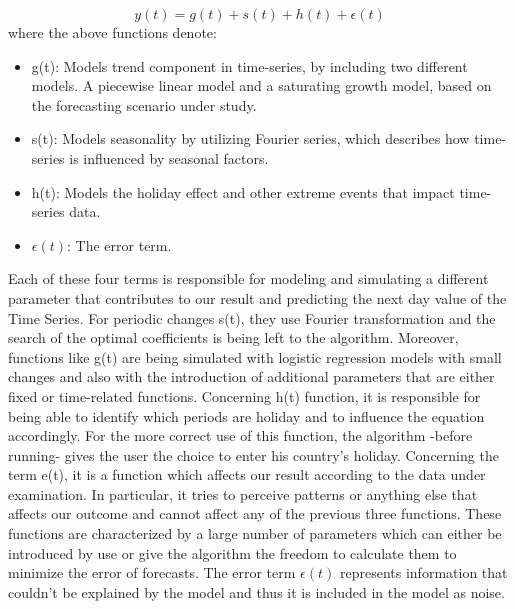 $$y(t)=g(t)+s(t)+h(t)+\epsilon(t)$$
\noindent where the above functions denote:
\begin{itemize}
    \item g(t): Models trend component in time-series, by including two different models. A piecewise linear model and a saturating growth model, based on the forecasting scenario under study.
    \item s(t): Models seasonality by utilizing Fourier series, which describes how time-series is influenced by seasonal factors.
    \item h(t): Models the holiday effect and other extreme events that impact time-series data.
        \item $\epsilon(t)$: The error term.
\end{itemize}
\par Each of these four terms is responsible for modeling and simulating a different parameter that contributes to our result and predicting the next day value of the Time Series. For periodic changes s(t), they use Fourier transformation and the search of the optimal coefficients is being left to the algorithm. Moreover, functions like g(t) are being simulated with logistic regression models with small changes and also with the introduction of additional parameters that are either fixed or time-related functions. Concerning h(t) function, it is responsible for being able to identify which periods are holiday and to influence the equation accordingly. For the more correct use of this function, the algorithm -before running- gives the user the choice to enter his country's holiday. 
Concerning the term e(t), it is a function which affects our result according to the data under examination. In particular, it tries to perceive patterns or anything else that affects our outcome and cannot affect any of the previous three functions. These functions are characterized by a large number of parameters which can either be introduced by use or give the algorithm the freedom to calculate them to minimize the error of forecasts. The error term  $\epsilon(t)$  represents information that couldn't be explained by the model and thus it is included in the model as noise.

